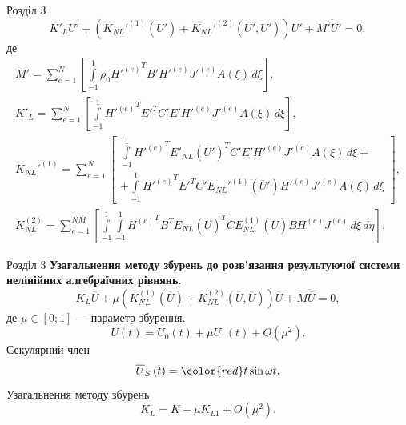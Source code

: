 \documentclass[8pt]{beamer}
\numberwithin{figure}{section}
\numberwithin{equation}{section}
\numberwithin{table}{section}
\begin{document}
\begin{frame}{Розділ 3}
\begin{equation}\label{eq:ode_fem}
K'_L\overline{U}'+\left( K_{NL}'^{(1)}\left( \overline{U}'\right)+K_{NL}'^{(2)}\left( \overline{U}',\overline{U}'\right) \right)\overline{U}'+M'\ddot{\overline{U}}'=0,
\end{equation}
де 
\begin{gather}
M'=\sum_{e=1}^{N}
\left[ \int\limits_{-1}^{1} \rho_0 {H'^{(e)}}^T B' H'^{(e)} J'^{(e)} A\left(\xi\right) \, d\xi \right],\\
K'_L=\sum_{e=1}^{N}
\left[ \int\limits_{-1}^{1}{H'^{(e)}}^T E'^T C' E' H'^{(e)} J'^{(e)} A\left(\xi\right) \, d\xi \right],\\
K_{NL}'^{(1)}=\sum_{e=1}^{N}
\left[ 
\begin{aligned}
\int\limits_{-1}^{1} {H'^{(e)}}^T E'_{NL}\left( \overline{U}'\right)^T C' E' H'^{(e)} J'^{(e)} A\left(\xi\right) \, d\xi  + \\ 
+ \int\limits_{-1}^{1} {H'^{(e)}}^T E'^T C' E_{NL}'^{(1)}\left( \overline{U}'\right) H'^{(e)} J'^{(e)} A\left(\xi\right) \, d\xi 
\end{aligned} 
\right],\\
K_{NL}^{(2)}=\sum_{e=1}^{NM}
\left[ 
\int\limits_{-1}^{1} \int\limits_{-1}^{1} {H^{(e)}}^T B^T E_{NL}\left( \overline{U}\right)^T C E_{NL}^{(1)}\left( \overline{U}\right) B H^{(e)} J^{(e)} \, d\xi \, d\eta 
\right].
\end{gather}

\end{frame}

\begin{frame}{Розділ 3}
\textbf{Узагальнення методу збурень до розв’язання результуючої системи нелінійних алгебраїчних рівнянь.}
\begin{equation}\label{eq:nonlineq}
K_L\overline{U}+\mu \left( K_{NL}^{(1)}\left( \overline{U}\right)+K_{NL}^{(2)}\left( \overline{U},\overline{U}\right) \right)\overline{U}+M\ddot{\overline{U}}=0,
\end{equation}
де $\mu \in [0;1]$ --- параметр збурення.
\begin{equation}
\overline{U}\left(t\right) =\overline{U}_0\left(t\right) + \mu \overline{U}_1\left(t\right) + O\left( \mu^2\right).
\end{equation}
Секулярний член
\begin{equation}
\overline{U}_S\left(t\right) =\begingroup\color{red}t\endgroup \sin \omega t.
\end{equation}
Узагальнення методу збурень
\begin{equation}
K_L = K - \mu K_{L1} + O\left( \mu^2\right).
\end{equation}

\end{frame}
\end{document}
